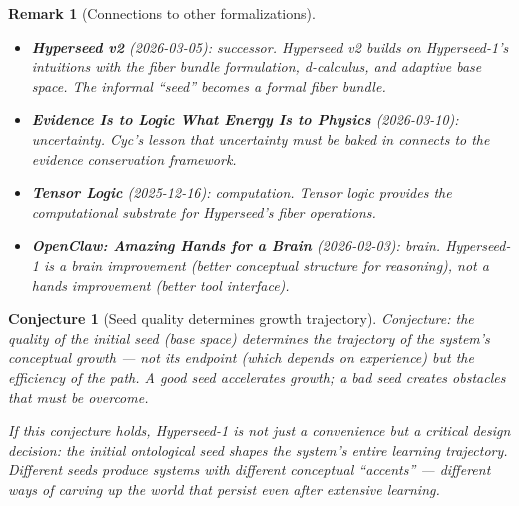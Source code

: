 \documentclass[11pt,a4paper]{article}
\newtheorem{remark}[definition]{Remark}
\newtheorem{conjecture}[definition]{Conjecture}
\begin{document}
\begin{remark}[Connections to other formalizations]
\begin{itemize}
\item \textbf{Hyperseed v2} (2026-03-05): successor. Hyperseed v2 builds on
  Hyperseed-1's intuitions with the fiber bundle formulation, d-calculus,
  and adaptive base space. The informal ``seed'' becomes a formal fiber
  bundle.
\item \textbf{Evidence Is to Logic What Energy Is to Physics} (2026-03-10):
  uncertainty. Cyc's lesson that uncertainty must be baked in connects to
  the evidence conservation framework.
\item \textbf{Tensor Logic} (2025-12-16): computation. Tensor logic provides
  the computational substrate for Hyperseed's fiber operations.
\item \textbf{OpenClaw: Amazing Hands for a Brain} (2026-02-03): brain.
  Hyperseed-1 is a brain improvement (better conceptual structure for
  reasoning), not a hands improvement (better tool interface).
\end{itemize}
\end{remark}

\begin{conjecture}[Seed quality determines growth trajectory]
Conjecture: the quality of the initial seed (base space) determines the
trajectory of the system's conceptual growth --- not its endpoint (which
depends on experience) but the efficiency of the path. A good seed
accelerates growth; a bad seed creates obstacles that must be overcome.

If this conjecture holds, Hyperseed-1 is not just a convenience but a
critical design decision: the initial ontological seed shapes the system's
entire learning trajectory. Different seeds produce systems with different
conceptual ``accents'' --- different ways of carving up the world that
persist even after extensive learning.
\end{conjecture}
\end{document}
